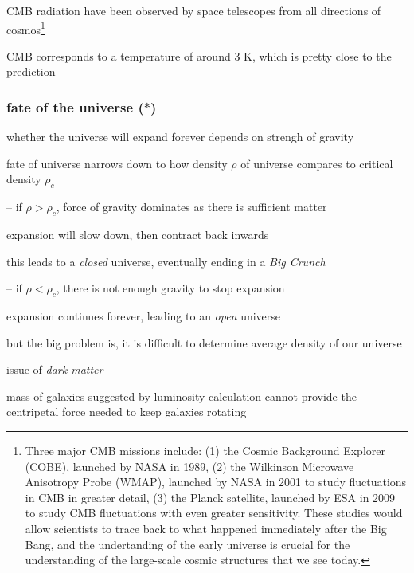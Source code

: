CMB radiation have been observed by space telescopes from all directions of cosmos\footnote{Three major CMB missions include: (1) the Cosmic Background Explorer (COBE), launched by NASA in 1989, (2) the Wilkinson Microwave Anisotropy Probe (WMAP), launched by NASA in 2001 to study fluctuations in CMB in greater detail, (3) the Planck satellite, launched by ESA in 2009 to study CMB fluctuations with even greater sensitivity. These studies would allow scientists to trace back to what happened immediately after the Big Bang, and the undertanding of the early universe is crucial for the understanding of the large-scale cosmic structures that we see today.}

CMB corresponds to a temperature of around 3 K, which is pretty close to the prediction



\subsubsection{fate of the universe ($\ast$)}

whether the universe will expand forever depends on strengh of gravity

fate of universe narrows down to how density $\rho$ of universe compares to critical density $\rho_c$

\begin{compactitem}

\item[--] if $\rho > \rho_c$, force of gravity dominates as there is sufficient matter

expansion will slow down, then contract back inwards

this leads to a \emph{closed} universe, eventually ending in a \emph{Big Crunch} 

\item[--] if $\rho < \rho_c$, there is not enough gravity to stop expansion

expansion continues forever, leading to an \emph{open} universe

\end{compactitem}

but the big problem is, it is difficult to determine average density of our universe

\cmt issue of \emph{dark matter}

mass of galaxies suggested by luminosity calculation cannot provide the centripetal force needed to keep galaxies rotating

